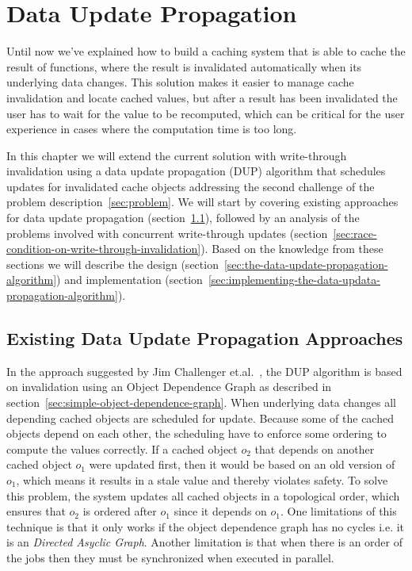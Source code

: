 \chapter{Data Update Propagation}
\label{chapter:data-update-propagation}

Until now we've explained how to build a caching system that is able to cache the result of functions, where the result is invalidated automatically when its underlying data changes. This solution makes it easier to manage cache invalidation and locate cached values, but after a result has been invalidated the user has to wait for the value to be recomputed, which can be critical for the user experience in cases where the computation time is too long.

In this chapter we will extend the current solution with write-through invalidation using a data update propagation (DUP) algorithm that schedules updates for invalidated cache objects addressing the second challenge of the problem description~\ref{sec:problem}. We will start by covering existing approaches for data update propagation (section~\ref{sec:existing-data-update-propagation-approaches}), followed by an analysis of the problems involved with concurrent write-through updates (section~\ref{sec:race-condition-on-write-through-invalidation}). Based on the knowledge from these sections we will describe the design (section~\ref{sec:the-data-update-propagation-algorithm}) and implementation (section~\ref{sec:implementing-the-data-updata-propagation-algorithm}).

\section{Existing Data Update Propagation Approaches}
\label{sec:existing-data-update-propagation-approaches}

In the approach suggested by Jim Challenger et.al.~\cite{paper:ibm, paper:ibm-extended, paper:ibm-publishing-system}, the DUP algorithm is based on invalidation using an Object Dependence Graph as described in section~\ref{sec:simple-object-dependence-graph}. When underlying data changes all depending cached objects are scheduled for update. Because some of the cached objects depend on each other, the scheduling have to enforce some ordering to compute the values correctly. If a cached object $o_2$ that depends on another cached object $o_1$ were updated first, then it would be based on an old version of $o_1$, which means it results in a stale value and thereby violates safety. To solve this problem, the system updates all cached objects in a topological order, which ensures that $o_2$ is ordered after $o_1$ since it depends on $o_1$. One limitations of this technique is that it only works if the object dependence graph has no cycles i.e. it is an \emph{Directed Asyclic Graph}. Another limitation is that when there is an order of the jobs then they must be synchronized when executed in parallel.

